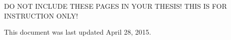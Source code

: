    \begin{center}
	DO NOT INCLUDE THESE PAGES IN YOUR THESIS! THIS IS FOR
	INSTRUCTION ONLY!
    \end{center}

    \vfill
    \noindent
    This document was last updated April 28, 2015.
	

    

    
    
    
    
    
    
    
    
    
    
    
    \appendix
    

    

